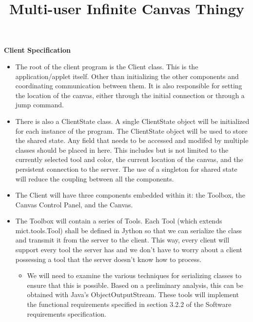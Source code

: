 \documentclass[12pt]{article}
\title{Multi-user Infinite Canvas Thingy}
\begin{document}
 \maketitle
 \textbf{Client Specification}
 \begin{itemize}
 \item
    The root of the client program is the Client class. This is the
    application/applet itself. Other than initializing the other components and
    coordinating communication between them. It is also responsible for setting
    the location of the canvas, either through the initial connection or
    through a jump command.
 \item
     There is also a ClientState class. A single ClientState object will be initialized for each instance of the program. The ClientState object will be used to store the shared state. Any field that needs to be accessed and modifed by multiple classes should be placed in here. This includes but is not limited to the currently selected tool and color, the current location of the canvas, and the persistent connection to the server. The use of a singleton for shared state will reduce the coupling between all the components.
 \item
 The Client will have three components embedded within it: the Toolbox,
 the Canvas Control Panel, and the Canvas.
 \item
  The Toolbox will contain a series of Tools. Each Tool (which extends mict.tools.Tool) shall be defined in Jython so that we can serialize the class and transmit it from the server to the client. This way, every client will support every tool the server has and we don't have to worry about a client possessing a tool that the server doesn't know how to process.
  \begin{itemize}
  \item
  We will need to examine the various techniques for serializing classes to
  ensure that this is possible. Based on a preliminary analysis, this can be
  obtained with Java’s ObjectOutputStream. These tools
  will implement the functional requirements specified in section 3.2.2 of the
  Software requirements specification.


\end{itemize}
\end{itemize}
\end{document}
